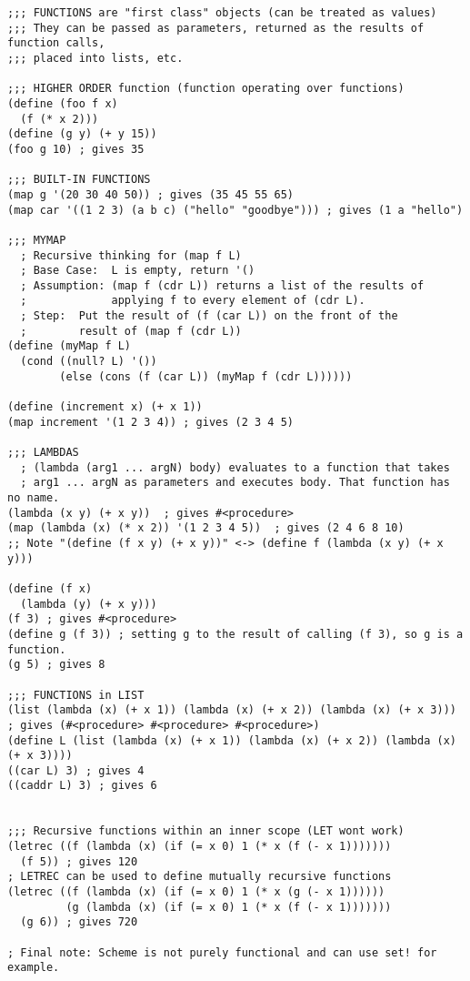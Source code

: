 \documentclass[20pt]{article}
\begin{document}
\begin{verbatim}
;;; FUNCTIONS are "first class" objects (can be treated as values)
;;; They can be passed as parameters, returned as the results of function calls, 
;;; placed into lists, etc.

;;; HIGHER ORDER function (function operating over functions)
(define (foo f x)
  (f (* x 2)))
(define (g y) (+ y 15))
(foo g 10) ; gives 35

;;; BUILT-IN FUNCTIONS
(map g '(20 30 40 50)) ; gives (35 45 55 65)             
(map car '((1 2 3) (a b c) ("hello" "goodbye"))) ; gives (1 a "hello")

;;; MYMAP
  ; Recursive thinking for (map f L)
  ; Base Case:  L is empty, return '()
  ; Assumption: (map f (cdr L)) returns a list of the results of
  ;             applying f to every element of (cdr L).
  ; Step:  Put the result of (f (car L)) on the front of the
  ;        result of (map f (cdr L))
(define (myMap f L)
  (cond ((null? L) '())
        (else (cons (f (car L)) (myMap f (cdr L))))))

(define (increment x) (+ x 1))
(map increment '(1 2 3 4)) ; gives (2 3 4 5)

;;; LAMBDAS
  ; (lambda (arg1 ... argN) body) evaluates to a function that takes 
  ; arg1 ... argN as parameters and executes body. That function has no name.
(lambda (x y) (+ x y))  ; gives #<procedure>
(map (lambda (x) (* x 2)) '(1 2 3 4 5))  ; gives (2 4 6 8 10)
;; Note "(define (f x y) (+ x y))" <-> (define f (lambda (x y) (+ x y)))

(define (f x)
  (lambda (y) (+ x y)))
(f 3) ; gives #<procedure>
(define g (f 3)) ; setting g to the result of calling (f 3), so g is a function.
(g 5) ; gives 8

;;; FUNCTIONS in LIST
(list (lambda (x) (+ x 1)) (lambda (x) (+ x 2)) (lambda (x) (+ x 3)))
; gives (#<procedure> #<procedure> #<procedure>)
(define L (list (lambda (x) (+ x 1)) (lambda (x) (+ x 2)) (lambda (x) (+ x 3))))
((car L) 3) ; gives 4
((caddr L) 3) ; gives 6


;;; Recursive functions within an inner scope (LET wont work)
(letrec ((f (lambda (x) (if (= x 0) 1 (* x (f (- x 1)))))))
  (f 5)) ; gives 120
; LETREC can be used to define mutually recursive functions
(letrec ((f (lambda (x) (if (= x 0) 1 (* x (g (- x 1))))))
         (g (lambda (x) (if (= x 0) 1 (* x (f (- x 1)))))))
  (g 6)) ; gives 720

; Final note: Scheme is not purely functional and can use set! for example.
\end{verbatim}
\end{document}
